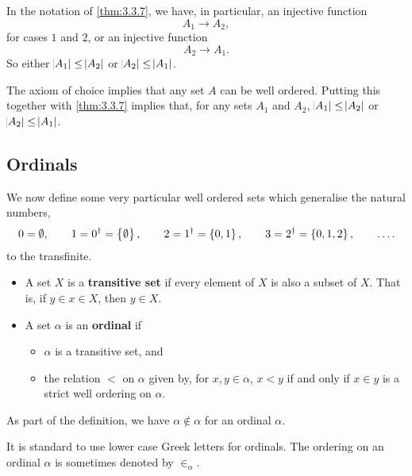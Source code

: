 \pagebreak


\begin{remark*}
In the notation of \ref{thm:3.3.7}, we have, in particular, an injective function
$$ A_1 \to A_2, $$
for cases $ 1 $ and $ 2 $, or an injective function
$$ A_2 \to A_1. $$
So either $ \abs{A_1} \le \abs{A_2} $ or $ \abs{A_2} \le \abs{A_1} $.
\end{remark*}

The axiom of choice implies that any set $ A $ can be well ordered. Putting this together with \ref{thm:3.3.7} implies that, for any sets $ A_1 $ and $ A_2 $, $ \abs{A_1} \le \abs{A_2} $ or $ \abs{A_2} \le \abs{A_1} $.

\subsection{Ordinals}

We now define some very particular well ordered sets which generalise the natural numbers,
$$ 0 = \emptyset, \qquad 1 = 0^\dagger = \cbr{\emptyset}, \qquad 2 = 1^\dagger = \cbr{0, 1}, \qquad 3 = 2^\dagger = \cbr{0, 1, 2}, \qquad \dots. $$
to the transfinite.

\begin{definition}
\hfill
\begin{itemize}
\item A set $ X $ is a \textbf{transitive set} if every element of $ X $ is also a subset of $ X $. That is, if $ y \in x \in X $, then $ y \in X $.
\item A set $ \alpha $ is an \textbf{ordinal} if
\begin{itemize}
\item $ \alpha $ is a transitive set, and
\item the relation $ < $ on $ \alpha $ given by, for $ x, y \in \alpha $, $ x < y $ if and only if $ x \in y $ is a strict well ordering on $ \alpha $.
\end{itemize}
\end{itemize}
\end{definition}

\begin{note*}
As part of the definition, we have $ \alpha \notin \alpha $ for an ordinal $ \alpha $.
\end{note*}

It is standard to use lower case Greek letters for ordinals. The ordering on an ordinal $ \alpha $ is sometimes denoted by $ \in_\alpha $.

